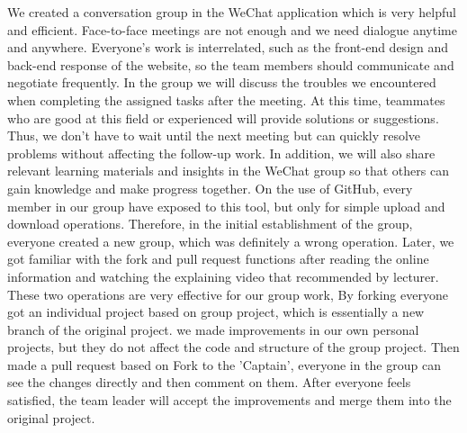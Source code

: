  
\vspace{0.2cm}


\noindent We created a conversation group in the WeChat application which is very helpful and efficient. Face-to-face meetings are not enough and we need dialogue anytime and anywhere. Everyone's work is interrelated, such as the front-end design and back-end response of the website, so the team members should communicate and negotiate frequently. In the group we will discuss the troubles we encountered when completing the assigned tasks after the meeting. At this time, teammates who are good at this field or experienced will provide solutions or suggestions. Thus, we don't have to wait until the next meeting but can quickly resolve problems without affecting the follow-up work.  In addition, we will also share relevant learning materials and insights in the WeChat group so that others can gain knowledge and make progress together.
On the use of GitHub, every member in our group have exposed to this tool, but only for simple upload and download operations. Therefore, in the initial establishment of the group, everyone created a new group, which was definitely a wrong operation. Later, we got familiar with the fork and pull request functions after reading the online information and watching the explaining video that recommended by lecturer. These two operations are very effective for our group work, By forking everyone got an individual project based on group project, which is essentially a new branch of the original project. we made improvements in our own personal projects, but they do not affect the code and structure of the group project. Then made a pull request based on Fork to the 'Captain', everyone in the group can see the changes directly and then comment on them. After everyone feels satisfied, the team leader will accept the improvements and merge them into the original project.
\vspace{0.2cm}

